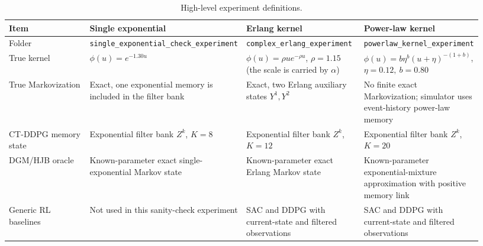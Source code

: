 \documentclass[11pt]{article}
\newcommand{\code}[1]{\texttt{#1}}
\begin{document}
\begin{table}[h!]
\centering
\caption{High-level experiment definitions.}
\label{tab:experiment_definitions}
\small
\begin{tabular}{p{0.18\linewidth}p{0.25\linewidth}p{0.25\linewidth}p{0.25\linewidth}}
\toprule
Item & Single exponential & Erlang kernel & Power-law kernel \\
\midrule
Folder &
\code{single\_exponential\_check\_experiment} &
\code{complex\_erlang\_experiment} &
\code{powerlaw\_kernel\_experiment} \\
True kernel &
\(\phi(u)=e^{-1.30u}\) &
\(\phi(u)=\rho u e^{-\rho u}\), \(\rho=1.15\) (the scale is carried by \(\alpha\)) &
\(\phi(u)=b\eta^b(u+\eta)^{-(1+b)}\), \(\eta=0.12,\ b=0.80\) \\
True Markovization &
Exact, one exponential memory is included in the filter bank &
Exact, two Erlang auxiliary states \(Y^1,Y^2\) &
No finite exact Markovization; simulator uses event-history power-law memory \\
CT-DDPG memory state &
Exponential filter bank \(Z^k\), \(K=8\) &
Exponential filter bank \(Z^k\), \(K=12\) &
Exponential filter bank \(Z^k\), \(K=20\) \\
DGM/HJB oracle &
Known-parameter exact single-exponential Markov state &
Known-parameter exact Erlang Markov state &
Known-parameter exponential-mixture approximation with positive memory link \\
Generic RL baselines &
Not used in this sanity-check experiment &
SAC and DDPG with current-state and filtered observations &
SAC and DDPG with current-state and filtered observations \\
\bottomrule
\end{tabular}
\end{table}
\end{document}
